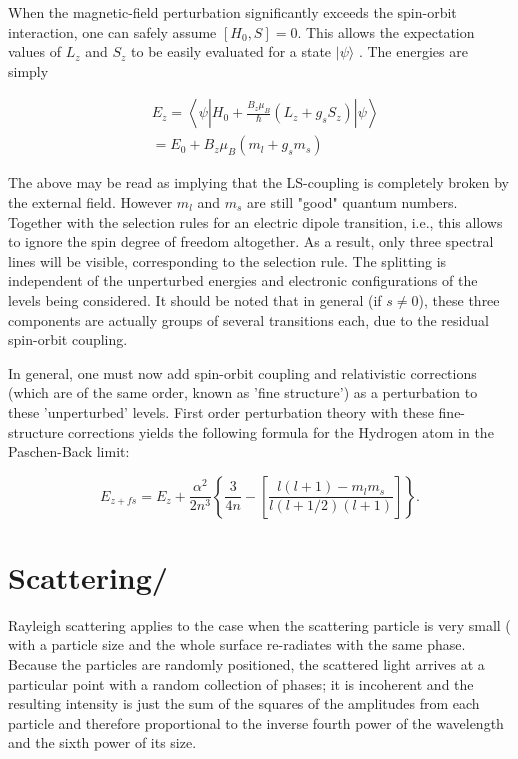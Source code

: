 When the magnetic-field perturbation significantly exceeds the spin-orbit interaction, one can safely assume $[H_{0}, S] = 0$. This allows the expectation values of $L_{z}$ and $S_{z}$ to be easily evaluated for a state $|\psi\rangle$ . The energies are simply

\begin{align*}
&E_{z} = \left\langle \psi \left| H_{0} + \frac{B_{z}\mu_B}{\hbar}(L_{z}+g_{s}S_z) \right|\psi\right\rangle\\
&=E_{0} + B_z\mu_B (m_l + g_{s}m_s)
\end{align*} 

The above may be read as implying that the LS-coupling is completely broken by the external field. However $m_l$ and $m_s$ are still "good" quantum numbers. Together with the selection rules for an electric dipole transition, i.e.,  this allows to ignore the spin degree of freedom altogether. As a result, only three spectral lines will be visible, corresponding to the  selection rule. The splitting  is independent of the unperturbed energies and electronic configurations of the levels being considered. It should be noted that in general (if $s \neq 0$), these three components are actually groups of several transitions each, due to the residual spin-orbit coupling.

In general, one must now add spin-orbit coupling and relativistic corrections (which are of the same order, known as 'fine structure') as a perturbation to these 'unperturbed' levels. First order perturbation theory with these fine-structure corrections yields the following formula for the Hydrogen atom in the Paschen-Back limit:

\begin{equation*}
E_{z+fs} = E_{z} + \frac{\alpha^2}{2 n^3} \left\{ \frac{3}{4n} - \left[ \frac{l(l+1) - m_l m_s}{l(l+1/2)(l+1) } \right]\right\}. 
\end{equation*}



\section{Scattering/}

Rayleigh scattering applies to the case when the scattering particle is very small ( with a particle size and the whole surface re-radiates with the same phase. Because the particles are randomly positioned, the scattered light arrives at a particular point with a random collection of phases; it is incoherent and the resulting intensity is just the sum of the squares of the amplitudes from each particle and therefore proportional to the inverse fourth power of the wavelength and the sixth power of its size.
 
